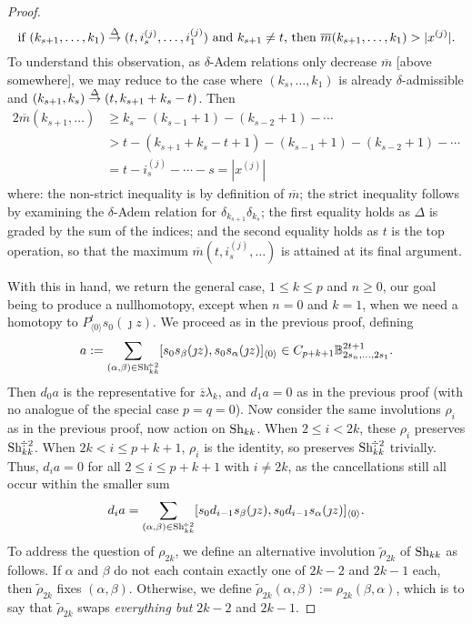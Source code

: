 \documentclass[11pt]{amsart}
\theoremstyle{plain}
\theoremstyle{definition}
\theoremstyle{plain}
\newcommand{\deltaalg}{\Delta} %
\newcommand{\minDimP}{\overline{m}}
\newcommand{\produces}[3]{#3:#1\sim #2}
\renewcommand{\produces}[3]{#1\rightarrow_{#3} #2}%
\renewcommand{\produces}[3]{#1\overset{\smash{#3}}{\rightarrow} #2}%
\newcommand{\Shuffles}[2]{\textup{Sh}_{#1#2}}
\newcommand{\HalfShuffles}[2]{\textup{Sh}_{#1#2}^{\smash{\!\div2}}}
\begin{document}
\begin{Koszul complexes}
\begin{proof}
\[\textup{if }\produces{(k_{s+1},\ldots,k_1)}{(t,i_{s}^{(j)},\ldots,i_1^{(j)})}{\deltaalg}\textup{ and }k_{s+1}\neq t\textup{, then }\minDimP(k_{s+1},\ldots,k_1)>|x^{(j)}|.\]
To understand this observation, as $\delta$-Adem relations only decrease $\minDimP$ [above somewhere], we may reduce to the case where $(k_s,\ldots,k_1)$ is already $\delta$-admissible and $\produces{(k_{s+1},k_{s})}{(t,k_{s+1}+k_{s}-t)}{\deltaalg}$. Then
\begin{alignat*}{2}
\minDimP(k_{s+1},\ldots)&\geq k_{s}-(k_{s-1}+1)-(k_{s-2}+1)-\cdots  \\
&> t-(k_{s+1}+k_s-t+1)-(k_{s-1}+1)-(k_{s-2}+1)-\cdots  \\
&=t-i^{(j)}_{s}-\cdots -s=|x^{(j)}|
\end{alignat*}
where: the non-strict inequality is by definition of $\minDimP$; the strict inequality follows by examining the $\delta$-Adem relation for $\delta_{k_{s+1}}\delta_{k_{s}}$; the first equality holds as $\deltaalg$ is graded by the sum of the indices; and the second equality holds as $t$ is the top operation, so that the maximum $\minDimP(t,i^{(j)}_{s},\ldots)$ is attained at its final argument.

With this in hand, we return the general case, $1\leq k\leq p$ and $n\geq0$, our goal being to produce a nullhomotopy, except when $n=0$ and $k=1$, when we need a homotopy to $P^t_{\langle 0\rangle}s_0(\jmath z)$. We proceed as in the previous proof, defining
\[a:=\sum_{(\alpha,\beta)\in\HalfShuffles{k}{k}}[s_{0}s_\beta(\jmath z), s_{0}s_\alpha(\jmath z)]_{\langle 0\rangle}\in C_{p+k+1}\mathbb{B}_{2s_n,\ldots,2s_1}^{2t+1}.\]
Then $d_0a$ is the representative for $\overline{z}\lambda_k$, and $d_1a=0$ as in the previous proof (with no analogue of the special case $p=q=0$). Now consider the same involutions $\rho_i$ as in the previous proof, now action on $\Shuffles{k}{k}$. When $2\leq i< 2k$, these $\rho_i$ preserves $\HalfShuffles{k}{k}$. When $2k<i\leq p+k+1$, $\rho_i$ is the identity, so preserves $\HalfShuffles{k}{k}$ trivially. Thus, $d_ia=0$ for all $2\leq i\leq p+k+1$ with $i\neq2k$, as  the cancellations still all occur within the smaller sum
\[d_{i}a=\sum_{(\alpha,\beta)\in\HalfShuffles{k}{k}} [s_{0}d_{i-1}s_\beta(\jmath z), s_{0}d_{i-1}s_\alpha(\jmath z)]_{\langle 0\rangle}.\]
To address the question of $\rho_{2k}$, we define an alternative involution $\widetilde{\rho}_{2k}$ of $\Shuffles{k}{k}$ as follows.  If $\alpha$ and $\beta$ do not each contain exactly one of $2k-2$ and $2k-1$ each, then $\widetilde{\rho}_{2k}$ fixes $(\alpha,\beta)$. Otherwise, we define $\widetilde{\rho}_{2k}(\alpha,\beta):=\rho_{2k}(\beta,\alpha)$, which is to say that $\widetilde{\rho}_{2k}$ swaps \emph{everything but} $2k-2$ and $2k-1$.


\end{proof}
\end{Koszul complexes}
\end{document}
